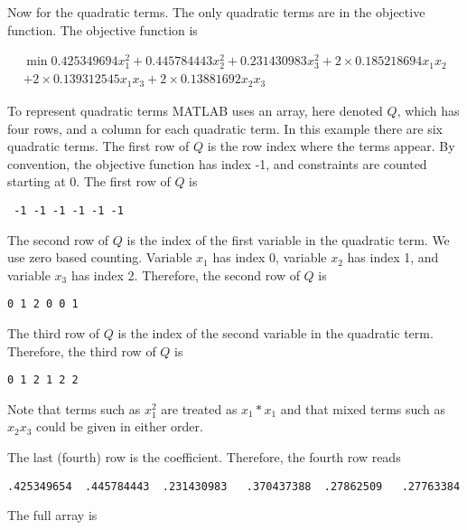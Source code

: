 Now for the quadratic terms. The only quadratic terms are in the objective function. The objective function is


\begin{eqnarray*}
\min  0.425349694 x_{1}^{2} +  0.445784443 x_{2}^{2} + 0.231430983 x_{3}^{2} + 2 \times 0.185218694 x_{1} x_{2} \\
+ 2 \times 0.139312545 x_{1} x_{3} + 2 \times 0.13881692 x_{2} x_{3}
\end{eqnarray*}


To represent quadratic terms MATLAB uses an array, here denoted $Q$, which has four rows, and a column for each quadratic term. 
In this example there are six quadratic terms. The first row of $Q$ is the row index where the terms appear. By convention, 
the objective function has index -1, and constraints are counted starting at 0.  The first row of $Q$ is


 \begin{verbatim}
 -1 -1 -1 -1 -1 -1
 \end{verbatim}

The second row of $Q$ is the index of the first variable in the quadratic term. We use zero based counting.  
Variable $x_{1}$ has index 0, variable  $x_{2}$ has index 1, and variable $x_{3}$ has index 2.  
Therefore, the second row of $Q$ is



\begin{verbatim}
0 1 2 0 0 1
\end{verbatim}



The third row of $Q$ is the index of the second variable in the quadratic term.   Therefore, the third row of $Q$ is



\begin{verbatim}
0 1 2 1 2 2
\end{verbatim}

Note that terms such as $x_1^2$ are treated as $x_1*x_1$ and that mixed terms such as $x_2x_3$ could be given in either order.

The last (fourth) row is the coefficient. Therefore, the fourth row reads





\begin{verbatim}
.425349654  .445784443  .231430983   .370437388  .27862509   .27763384
\end{verbatim}


The full array is



